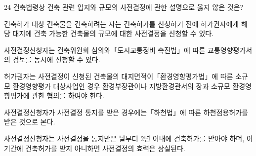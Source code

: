 \begin{question}{24}
건축법령상 건축 관련 입지와 규모의 사전결정에 관한 설명으로 옳지 않은 것은?
\begin{choices}
  \item 건축허가 대상 건축물을 건축하려는 자는 건축허가를 신청하기 전에 허가권자에게 해당 대지에 건축 가능한 건축물의 규모에 대한 사전결정을 신청할 수 있다.
  \item 사전결정신청자는 건축위원회 심의와「도시교통정비 촉진법」에 따른 교통영향평가서의 검토를 동시에 신청할 수 있다.
  \item 허가권자는 사전결정이 신청된 건축물의 대지면적이「환경영향평가법」에 따른 소규모 환경영향평가 대상사업인 경우 환경부장관이나 지방환경관서의 장과 소규모 환경영향평가에 관한 협의를 하여야 한다.
  \item 사전결정신청자가 사전결정 통지를 받은 경우에는「하천법」에 따른 하천점용허가를 받은 것으로 본다.
  \item 사전결정신청자는 사전결정을 통지받은 날부터 2년 이내에 건축허가를 받아야 하며, 이 기간에 건축허가를 받지 아니하면 사전결정의 효력은 상실된다.
\end{choices}
\end{question}
